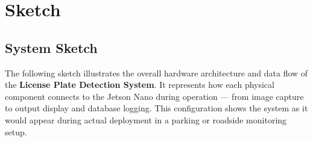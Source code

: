 %
%

\chapter{Sketch}

\section{System Sketch}

The following sketch illustrates the overall hardware architecture and data flow of the \textbf{License Plate Detection System}.  
It represents how each physical component connects to the Jetson Nano during operation — from image capture to output display and database logging.  
This configuration shows the system as it would appear during actual deployment in a parking or roadside monitoring setup.

